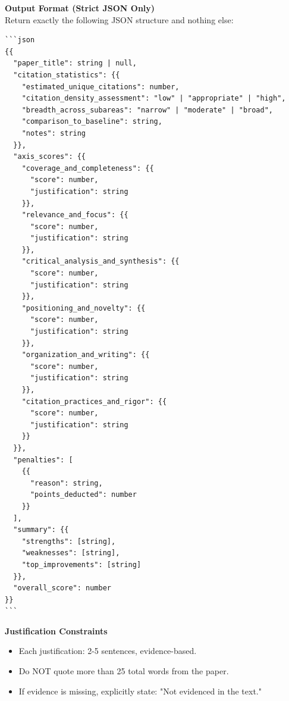 \vspace{1em}
\noindent\textbf{Output Format (Strict JSON Only)}\\
\vspace{0.5em}
Return exactly the following JSON structure and nothing else:

\begin{verbatim}
```json
{{
  "paper_title": string | null,
  "citation_statistics": {{
    "estimated_unique_citations": number,
    "citation_density_assessment": "low" | "appropriate" | "high",
    "breadth_across_subareas": "narrow" | "moderate" | "broad",
    "comparison_to_baseline": string,
    "notes": string
  }},
  "axis_scores": {{
    "coverage_and_completeness": {{
      "score": number,
      "justification": string
    }},
    "relevance_and_focus": {{
      "score": number,
      "justification": string
    }},
    "critical_analysis_and_synthesis": {{
      "score": number,
      "justification": string
    }},
    "positioning_and_novelty": {{
      "score": number,
      "justification": string
    }},
    "organization_and_writing": {{
      "score": number,
      "justification": string
    }},
    "citation_practices_and_rigor": {{
      "score": number,
      "justification": string
    }}
  }},
  "penalties": [
    {{
      "reason": string,
      "points_deducted": number
    }}
  ],
  "summary": {{
    "strengths": [string],
    "weaknesses": [string],
    "top_improvements": [string]
  }},
  "overall_score": number
}}
```
\end{verbatim}

\vspace{1em}
\noindent\textbf{Justification Constraints}
\begin{itemize}
\item Each justification: 2-5 sentences, evidence-based.
\item Do NOT quote more than 25 total words from the paper.
\item If evidence is missing, explicitly state: "Not evidenced in the text."
\end{itemize}